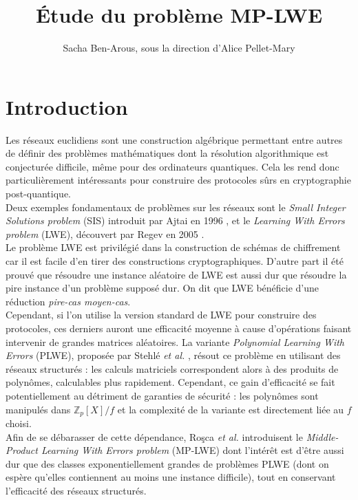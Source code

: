 \documentclass[11pt,a4paper]{article}
\title{\textbf{Étude du problème MP-LWE}}
\date{}
\author{Sacha Ben-Arous, sous la direction d'Alice Pellet-Mary}
\begin{document}
\maketitle 



\tableofcontents
\newpage
\section{Introduction}
\; Les réseaux euclidiens sont une construction algébrique permettant entre autres de définir des problèmes mathématiques dont la résolution algorithmique est conjecturée difficile, même pour des ordinateurs quantiques. Cela les rend donc particulièrement intéressants pour construire des protocoles sûrs en cryptographie post-quantique. \\
Deux exemples fondamentaux de problèmes sur les réseaux sont le \textit{Small Integer Solutions problem} (SIS) introduit par Ajtai en 1996 \cite{sis}, et le \textit{Learning With Errors problem} (LWE), découvert par Regev en 2005 \cite{lwe}. \\
Le problème LWE est privilégié dans la construction de schémas de chiffrement car il est facile d'en tirer des constructions cryptographiques. D'autre part il été prouvé \cite{lwe} que résoudre une instance aléatoire de LWE est aussi dur que résoudre la pire instance d'un problème supposé dur. On dit que LWE bénéficie d'une réduction \textit{pire-cas moyen-cas}. \\
Cependant, si l'on utilise la version standard de LWE pour construire des protocoles, ces derniers auront une efficacité moyenne à cause d'opérations faisant intervenir de grandes matrices aléatoires. La variante \textit{Polynomial Learning With Errors} (PLWE), proposée par Stehlé \textit{et al.} \cite{plwe}, résout ce problème en utilisant des réseaux structurés : les calculs matriciels correspondent alors à des produits de polynômes, calculables plus rapidement. Cependant, ce gain d'efficacité se fait potentiellement au détriment de garanties de sécurité : les polynômes sont manipulés dans $\mathbb{Z}_p[X]/f$ et la complexité de la variante est directement liée au $f$ choisi. \\
Afin de se débarasser de cette dépendance, Roşca \textit{et al.} introduisent le \textit{Middle-Product Learning With Errors problem} (MP-LWE) \cite{mplwe} dont l'intérêt est d'être aussi dur que des classes exponentiellement grandes de problèmes PLWE (dont on espère qu'elles contiennent au moins une instance difficile), tout en conservant l'efficacité des réseaux structurés. \\
\end{document}
